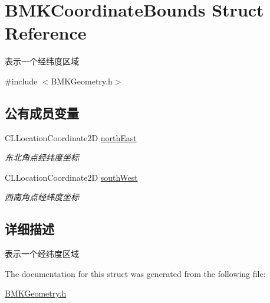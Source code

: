 \hypertarget{struct_b_m_k_coordinate_bounds}{\section{B\-M\-K\-Coordinate\-Bounds Struct Reference}
\label{struct_b_m_k_coordinate_bounds}
}


表示一个经纬度区域  




{\ttfamily \#include $<$B\-M\-K\-Geometry.\-h$>$}

\subsection*{公有成员变量}
\begin{DoxyCompactItemize}
\item 
\hypertarget{struct_b_m_k_coordinate_bounds_a0ebf42cb8682f2a6990fc7c6e439702e}{C\-L\-Location\-Coordinate2\-D \hyperlink{struct_b_m_k_coordinate_bounds_a0ebf42cb8682f2a6990fc7c6e439702e}{north\-East}}\label{struct_b_m_k_coordinate_bounds_a0ebf42cb8682f2a6990fc7c6e439702e}

\begin{DoxyCompactList}\small\item\em 东北角点经纬度坐标 \end{DoxyCompactList}\item 
\hypertarget{struct_b_m_k_coordinate_bounds_afd02c24b2ffe5aba18a125a48cdd1c37}{C\-L\-Location\-Coordinate2\-D \hyperlink{struct_b_m_k_coordinate_bounds_afd02c24b2ffe5aba18a125a48cdd1c37}{south\-West}}\label{struct_b_m_k_coordinate_bounds_afd02c24b2ffe5aba18a125a48cdd1c37}

\begin{DoxyCompactList}\small\item\em 西南角点经纬度坐标 \end{DoxyCompactList}\end{DoxyCompactItemize}


\subsection{详细描述}
表示一个经纬度区域 

The documentation for this struct was generated from the following file\-:\begin{DoxyCompactItemize}
\item 
\hyperlink{_b_m_k_geometry_8h}{B\-M\-K\-Geometry.\-h}\end{DoxyCompactItemize}
